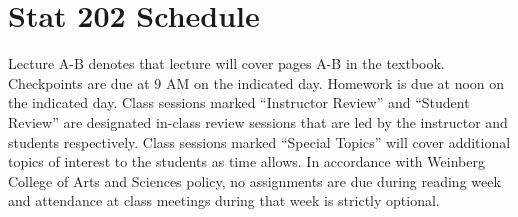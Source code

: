 \documentclass[10pt]{article}
\begin{document}
\section*{Stat 202 Schedule} 
Lecture A-B denotes that lecture will cover pages A-B in the
textbook. Checkpoints are due at 9 AM on the indicated day. Homework
is due at noon on the indicated day. Class sessions marked
``Instructor Review'' and ``Student Review'' are designated in-class
review sessions that are led by the instructor and students
respectively. Class sessions marked ``Special Topics'' will cover
additional topics of interest to the students as time allows. In
accordance with Weinberg College of Arts and Sciences policy, no
assignments are due during reading week and attendance at class
meetings during that week is strictly optional. \\
\end{document}
